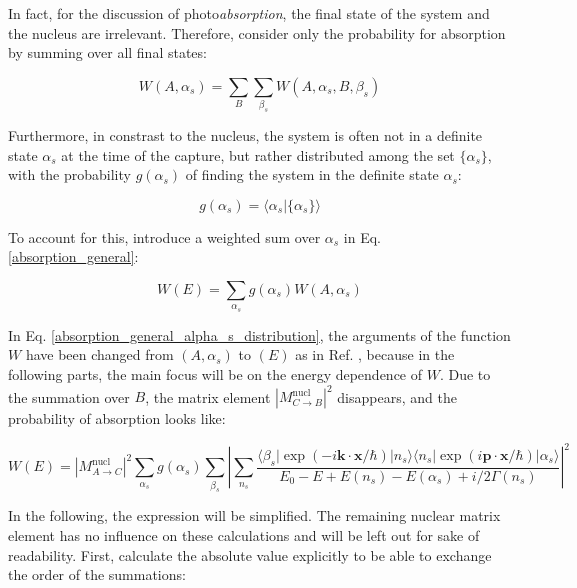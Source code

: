 \documentclass{article}
\begin{document}
In fact, for the discussion of photo\textit{absorption}, the final state of the system and the nucleus are irrelevant. Therefore, consider only the probability for absorption by summing over all final states:

\begin{equation}
\label{absorption_general_no_final}
	W(A, \alpha_s) = \sum_{B} \sum_{\beta_s} W(A, \alpha_s, B, \beta_s)
\end{equation}


Furthermore, in constrast to the nucleus, the system is often not in a definite state $\alpha_s$ at the time of the capture, but rather distributed among the set $\{ \alpha_s \}$, with the probability $g(\alpha_s)$ of finding the system in the definite state $\alpha_s$:

\begin{equation}
	\label{g_alpha}
	g(\alpha_s) = \langle \alpha_s | \{ \alpha_s \} \rangle
\end{equation}

To account for this, introduce a weighted sum over $\alpha_s$ in Eq. \ref{absorption_general}:

\begin{equation}
\label{absorption_general_alpha_s_distribution}
	W(E) = \sum_{\alpha_s} g(\alpha_s) W(A, \alpha_s)
\end{equation}

In Eq. \ref{absorption_general_alpha_s_distribution}, the arguments of the function $W$ have been changed from $\left( A, \alpha_s \right)$ to $\left( E \right)$ as in Ref. \cite{Lam39}, because in the following parts, the main focus will be on the energy dependence of $W$.
Due to the summation over $B$, the matrix element $\left| M^{\mathrm{nucl}}_{C \to B} \right|^2$ disappears, and the probability of absorption looks like:

\begin{equation}
\label{absorption_simplification_1}
	W(E) =  \left| M^\mathrm{nucl}_{A \to C} \right|^2 \sum_{\alpha_s} g(\alpha_s) \sum_{\beta_s} \left| \sum_{n_s} \frac{ \langle \beta_s | \exp{\left( - i \mathbf{k} \cdot \mathbf{x} / \hbar \right)} | n_s \rangle \langle n_s | \exp{\left( i \mathbf{p} \cdot \mathbf{x} / \hbar \right)} | \alpha_s \rangle  }{E_0 - E + E(n_s) - E(\alpha_s) + i/2 \Gamma(n_s)} \right| ^2
\end{equation}

In the following, the expression will be simplified. The remaining nuclear matrix element has no influence on these calculations and will be left out for sake of readability.
First, calculate the absolute value explicitly to be able to exchange the order of the summations:
\end{document}
